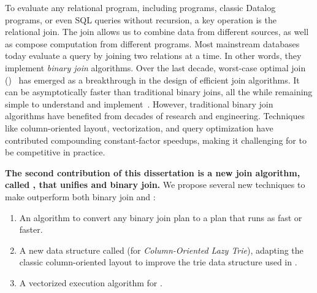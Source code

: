 To evaluate any relational program, 
 including \datalogo programs,
 classic Datalog programs, 
 or even SQL queries without recursion, 
 a key operation is the relational join.
The join allows us to combine data from different sources, 
 as well as compose computation from different programs.
Most mainstream databases today evaluate a query 
 by joining two relations at a time.
In other words, they implement {\em binary join} algorithms.
Over the last decade, worst-case optimal join (\WCOJ)~\cite{
  DBLP:conf/pods/NgoPRR12,
  DBLP:conf/icdt/Veldhuizen14, 
  DBLP:journals/sigmod/NgoRR13, 
  DBLP:conf/pods/000118}
 has emerged as
 a breakthrough in the design of efficient join algorithms.  
It can be
asymptotically faster than traditional binary joins, all the while
remaining simple to understand and
implement~\cite{DBLP:journals/sigmod/NgoRR13}.  
However, traditional binary join algorithms have benefited from 
  decades of research and engineering.
Techniques like column-oriented layout, vectorization, 
  and query optimization
  have contributed compounding constant-factor speedups,
  making it challenging for \WCOJ to be competitive in practice.

\textbf{
The second contribution of this dissertation is a new join algorithm,
  called \FJ, that unifies \WCOJ and binary join.}
We propose several new techniques to make \FJ outperform
both binary join and \WCOJ:
\begin{enumerate}
\item An algorithm to convert any binary join plan to a \FJ
  plan that runs as fast or faster.
\item A new data structure called
\COLT (for \emph{Column-Oriented Lazy Trie}), adapting the classic
column-oriented layout to improve the trie data structure used in
\WCOJ.
\item A vectorized execution algorithm for \FJ.
\end{enumerate}

